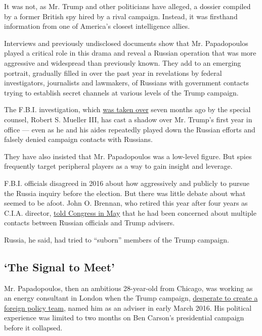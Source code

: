 It was not, as Mr. Trump and other politicians have alleged, a dossier
compiled by a former British spy hired by a rival campaign. Instead, it
was firsthand information from one of America's closest intelligence
allies.

Interviews and previously undisclosed documents show that Mr.
Papadopoulos played a critical role in this drama and reveal a Russian
operation that was more aggressive and widespread than previously known.
They add to an emerging portrait, gradually filled in over the past year
in revelations by federal investigators, journalists and lawmakers, of
Russians with government contacts trying to establish secret channels at
various levels of the Trump campaign.

The F.B.I. investigation, which
\href{https://www.nytimes3xbfgragh.onion/2017/05/17/us/politics/robert-mueller-special-counsel-russia-investigation.html}{was
taken over} seven months ago by the special counsel, Robert S. Mueller
III, has cast a shadow over Mr. Trump's first year in office --- even as
he and his aides repeatedly played down the Russian efforts and falsely
denied campaign contacts with Russians.

They have also insisted that Mr. Papadopoulos was a low-level figure.
But spies frequently target peripheral players as a way to gain insight
and leverage.

F.B.I. officials disagreed in 2016 about how aggressively and publicly
to pursue the Russia inquiry before the election. But there was little
debate about what seemed to be afoot. John O. Brennan, who retired this
year after four years as C.I.A. director,
\href{https://www.nytimes3xbfgragh.onion/2017/05/23/us/politics/congress-testimony-john-brennan-russia-budget.html}{told
Congress in May} that he had been concerned about multiple contacts
between Russian officials and Trump advisers.

Russia, he said, had tried to ``suborn'' members of the Trump campaign.

\hypertarget{the-signal-to-meet}{%
\subsection{`The Signal to Meet'}\label{the-signal-to-meet}}

Mr. Papadopoulos, then an ambitious 28-year-old from Chicago, was
working as an energy consultant in London when the Trump campaign,
\href{https://www.nytimes3xbfgragh.onion/2017/10/31/us/trump-foreign-policy-advisers.html}{desperate
to create a foreign policy team}, named him as an adviser in early March
2016. His political experience was limited to two months on Ben Carson's
presidential campaign before it collapsed.

